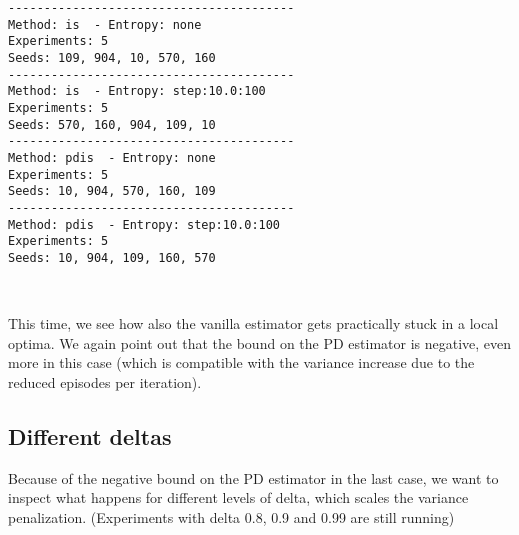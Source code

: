 \documentclass[11pt]{article}
\begin{document}
    \begin{Verbatim}[commandchars=\\\{\}]
----------------------------------------
Method: is  - Entropy: none
Experiments: 5
Seeds: 109, 904, 10, 570, 160
----------------------------------------
Method: is  - Entropy: step:10.0:100
Experiments: 5
Seeds: 570, 160, 904, 109, 10
----------------------------------------
Method: pdis  - Entropy: none
Experiments: 5
Seeds: 10, 904, 570, 160, 109
----------------------------------------
Method: pdis  - Entropy: step:10.0:100
Experiments: 5
Seeds: 10, 904, 109, 160, 570

    \end{Verbatim}

    \begin{center}
    \end{center}
    { \hspace*{\fill} \\}
    
    This time, we see how also the vanilla estimator gets practically stuck
in a local optima. We again point out that the bound on the PD estimator
is negative, even more in this case (which is compatible with the
variance increase due to the reduced episodes per iteration).

    \hypertarget{different-deltas}{%
\subsection{Different deltas}\label{different-deltas}}

Because of the negative bound on the PD estimator in the last case, we
want to inspect what happens for different levels of delta, which scales
the variance penalization. (Experiments with delta 0.8, 0.9 and 0.99 are
still running)
\end{document}
